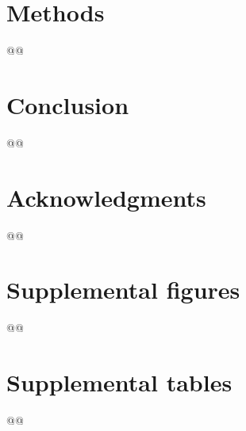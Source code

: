 \documentclass[a4paper,11pt,abstracton,hidelinks]{scrartcl}
\begin{document}
\section{Methods}\label{sec:methods}


@@


\section{Conclusion}\label{sec:conclusion}


@@


\section{Acknowledgments}\label{sec:acknowledgments}


@@


\printbibliography


\clearpage
\beginsupplement
\section{Supplemental figures}\label{sec:supplemental-figures}


@@


\clearpage
\section{Supplemental tables}\label{sec:supplemental-tables}


@@
\end{document}
